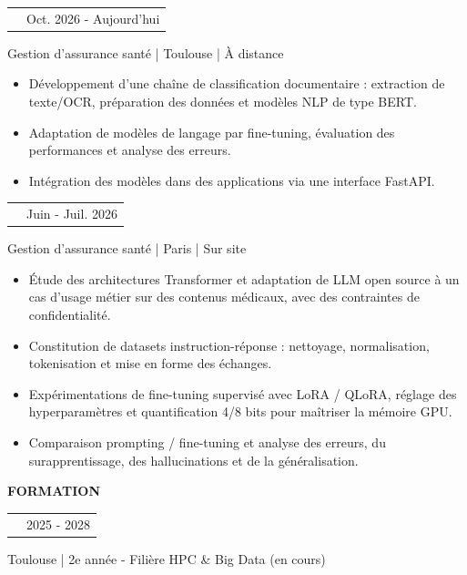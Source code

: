 \documentclass[10pt,a4paper]{extarticle}
\makeatletter
\newcommand{\CPMSURL}{https://www.cpms.fr/}
\newcommand{\cvsection}[1]{%
  \vspace{9pt}
  {\fontsize{10.5}{12.5}\selectfont\bfseries\color{CVAccent}\MakeUppercase{#1}}\par
  \vspace{3pt}{\color{CVGray!35}\hrule height .45pt}\vspace{4pt}}
\newcommand{\cvrole}[3]{%
  \begin{tabularx}{\linewidth}{@{}>{\raggedright\arraybackslash}X r@{}}
  {\bfseries #1} & {\fontsize{9}{11}\selectfont\color{CVGray}#2}
  \end{tabularx}\par
  {\fontsize{9}{11}\selectfont\color{CVGray}#3}\par\vspace{2pt}}
\newenvironment{cvbullets}{%
  \begin{itemize}[leftmargin=12pt,label=\textbullet,topsep=1pt,partopsep=0pt,parsep=0pt,itemsep=1.2pt]
}{\end{itemize}}
\makeatother
\begin{document}
\cvrole{Freelance IA \& Machine Learning | \href{\CPMSURL}{CPMS}}{Oct. 2026 - Aujourd'hui}{Gestion d’assurance santé | Toulouse | À distance}

\begin{cvbullets}

  \item Développement d'une chaîne de classification documentaire : extraction de texte/OCR, préparation des données et modèles NLP de type BERT.

  \item Adaptation de modèles de langage par fine-tuning, évaluation des performances et analyse des erreurs.

  \item Intégration des modèles dans des applications via une interface FastAPI.

\end{cvbullets}

\vspace{4pt}

\cvrole{Stagiaire IA générative / Fine-tuning de LLM | \href{\CPMSURL}{CPMS}}{Juin - Juil. 2026}{Gestion d’assurance santé | Paris | Sur site}

\begin{cvbullets}

  \item Étude des architectures Transformer et adaptation de LLM open source à un cas d’usage métier sur des contenus médicaux, avec des contraintes de confidentialité.

  \item Constitution de datasets instruction-réponse : nettoyage, normalisation, tokenisation et mise en forme des échanges.

  \item Expérimentations de fine-tuning supervisé avec LoRA / QLoRA, réglage des hyperparamètres et quantification 4/8 bits pour maîtriser la mémoire GPU.

  \item Comparaison prompting / fine-tuning et analyse des erreurs, du surapprentissage, des hallucinations et de la généralisation.

\end{cvbullets}

\cvsection{FORMATION}

\cvrole{Diplôme d'ingénieur en informatique | ENSEEIHT - Toulouse INP}{2025 - 2028}{Toulouse | 2e année - Filière HPC \& Big Data (en cours)}

\vspace{2pt}
\end{document}
